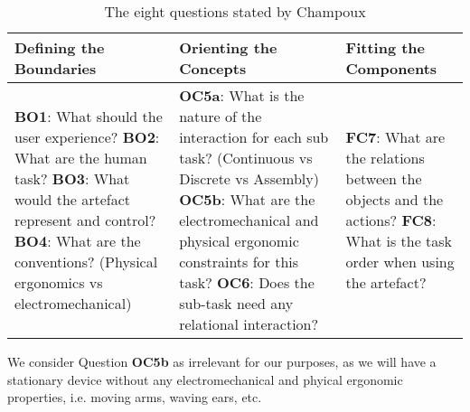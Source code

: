 \begin{table}[h]
	\begin{tabular}{| p{5.0cm} | p{5.0cm} | p{5.0cm} |}
	\hline
	\textbf{Defining the Boundaries} & \textbf{Orienting the Concepts} & \textbf{Fitting the Components} \\
	\hline
	\textbf{BO1}: What should the user experience? \newline
	\textbf{BO2}: What are the human task? \newline
	\textbf{BO3}: What would the artefact represent and control? \newline 
	\textbf{BO4}: What are the conventions? (Physical ergonomics vs electromechanical) \newline 
	&
	\textbf{OC5a}: What is the nature of the interaction for each sub task? (Continuous vs Discrete vs Assembly) \newline
	\textbf{OC5b}: What are the electromechanical and physical ergonomic constraints for this task? \newline
	\textbf{OC6}: Does the sub-task need any relational interaction? \newline
	&
	\textbf{FC7}: What are the relations between the objects and the actions? \newline 
	\textbf{FC8}: What is the task order when using the artefact? \\ 
	\hline
	
	\end{tabular}
	\caption{The eight questions stated by Champoux \cite{subramaniandesign}}
	\label{tab:tuidesign}
\end{table}  

We consider Question \textbf{OC5b} as irrelevant for our purposes, as we will have a stationary device without any electromechanical and phyical ergonomic properties, i.e. moving arms, waving ears, etc. 
 




